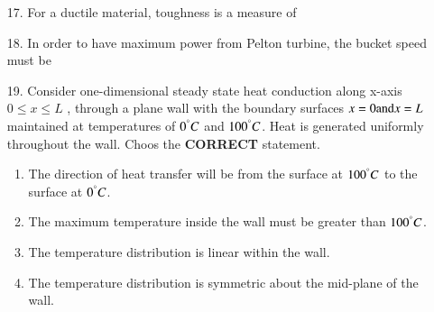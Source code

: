 \documentclass[journal,12pt,onecolumn]{IEEEtran}
\theoremstyle{remark}
\begin{document}
\begin{enumerate}
    \item[17.] For a ductile material, toughness is a measure of
        \hfill{}
        \begin{enumerate}
        \end{enumerate}

        \item[18.] In order to have maximum power from Pelton turbine, the bucket speed must be
        \hfill{}
        \begin{enumerate}
        \end{enumerate}


    \item[19.]  Consider one-dimensional steady state heat conduction along x-axis $0 \le x \le L$
        , through a plane wall with the boundary surfaces $x = 0 \textnormal{and} x = L$ maintained
        at temperatures of $0^{\degree}C$ and $100^{\degree}C$. Heat is generated uniformly throughout
        the wall. Choos the \textbf{CORRECT} statement.

        \hfill{}
        \begin{enumerate}
            \item The direction of heat transfer will be from the surface at $100^{\degree}C$ to the surface at $0^{\degree}C$.
            \item The maximum temperature inside the wall must be greater than $100^{\degree}C$.
            \item The temperature distribution is linear within the wall.
            \item The temperature distribution is symmetric about the mid-plane of the wall.
        \end{enumerate}



\end{enumerate}
\end{document}
